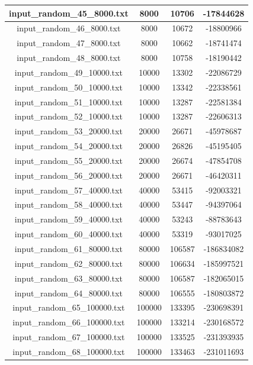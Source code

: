 \begin{longtable}{|c|c|c|c|}
		input\_random\_45\_8000.txt & 8000 & 10706 & -17844628 \\ \hline
		input\_random\_46\_8000.txt & 8000 & 10672 & -18800966 \\ \hline
		input\_random\_47\_8000.txt & 8000 & 10662 & -18741474 \\ \hline
		input\_random\_48\_8000.txt & 8000 & 10758 & -18190442 \\ \hline
		input\_random\_49\_10000.txt & 10000 & 13302 & -22086729 \\ \hline
		input\_random\_50\_10000.txt & 10000 & 13342 & -22338561 \\ \hline
		input\_random\_51\_10000.txt & 10000 & 13287 & -22581384 \\ \hline
		input\_random\_52\_10000.txt & 10000 & 13287 & -22606313 \\ \hline
		input\_random\_53\_20000.txt & 20000 & 26671 & -45978687 \\ \hline
		input\_random\_54\_20000.txt & 20000 & 26826 & -45195405 \\ \hline
		input\_random\_55\_20000.txt & 20000 & 26674 & -47854708 \\ \hline
		input\_random\_56\_20000.txt & 20000 & 26671 & -46420311 \\ \hline
		input\_random\_57\_40000.txt & 40000 & 53415 & -92003321 \\ \hline
		input\_random\_58\_40000.txt & 40000 & 53447 & -94397064 \\ \hline
		input\_random\_59\_40000.txt & 40000 & 53243 & -88783643 \\ \hline
		input\_random\_60\_40000.txt & 40000 & 53319 & -93017025 \\ \hline
		input\_random\_61\_80000.txt & 80000 & 106587 & -186834082 \\ \hline
		input\_random\_62\_80000.txt & 80000 & 106634 & -185997521 \\ \hline
		input\_random\_63\_80000.txt & 80000 & 106587 & -182065015 \\ \hline
		input\_random\_64\_80000.txt & 80000 & 106555 & -180803872 \\ \hline
		input\_random\_65\_100000.txt & 100000 & 133395 & -230698391 \\ \hline
		input\_random\_66\_100000.txt & 100000 & 133214 & -230168572 \\ \hline
		input\_random\_67\_100000.txt & 100000 & 133525 & -231393935 \\ \hline
		input\_random\_68\_100000.txt & 100000 & 133463 & -231011693 \\ \hline
	\end{longtable}

